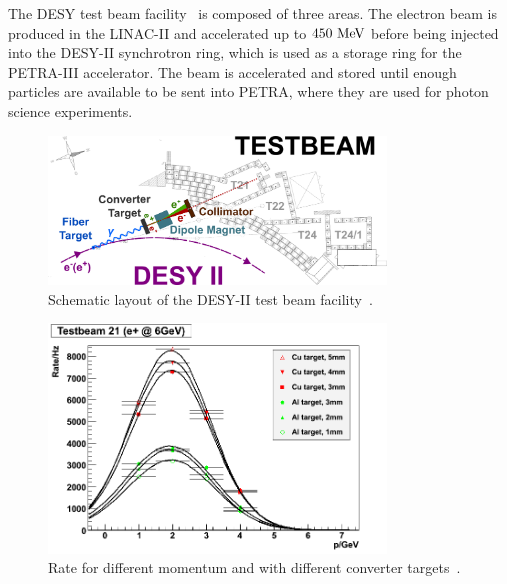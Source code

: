     The \gls{DESY} test beam facility~\cite{DESYII} is composed of three areas.
    The electron beam is produced in the LINAC-II and accelerated up to $450~\rm{MeV}$ before being injected into the DESY-II synchrotron ring, which is used as a storage ring for the PETRA-III accelerator. 
    The beam is accelerated and stored until enough particles are available to be sent into PETRA, where they are used for photon science experiments.

    \begin{figure}[!tbh]
      \centering
      \includegraphics[width = 0.8\textwidth]{Pictures/X0/desy_tb-sketch.png}
      \caption{Schematic layout of the DESY-II test beam facility~\cite{DESYII}.}
      \label{fig:desyTb-sketch}
    \end{figure}
    
    \begin{figure}[!tbh]
      \centering
      \includegraphics[width = 0.8\textwidth]{Pictures/X0/rate_vs_p_t21.png}
      \caption{Rate for different momentum and with different converter targets~\cite{DESYII}.}
      \label{fig:rateTB21}
    \end{figure}

